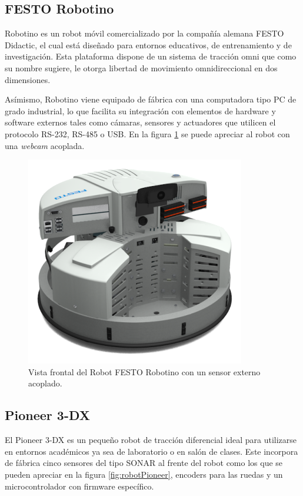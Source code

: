 \subsection{FESTO Robotino}

Robotino es un robot móvil comercializado por la compañía alemana FESTO Didactic, el cual está diseñado para entornos educativos, de entrenamiento y de investigación.
Esta plataforma dispone de un sistema de tracción omni que como su nombre sugiere, le otorga libertad de movimiento omnidireccional en dos dimensiones.

Asímismo, Robotino viene equipado de fábrica con una computadora tipo PC de grado industrial, lo que facilita su integración con elementos de hardware y software externos tales como cámaras, sensores y actuadores que utilicen el protocolo RS-232, RS-485 o USB. En la figura \ref{fig:robotRobotino} se puede apreciar al robot con una \textit{webcam} acoplada.

\begin{figure}[ht]
	\centering
	\includegraphics[scale=1.4]{./Figures/robotino.png}
	\caption{Vista frontal del Robot FESTO Robotino con un sensor externo acoplado.\protect\footnotemark}
	\label{fig:robotRobotino}
\end{figure}



\subsection{Pioneer 3-DX}

El Pioneer 3-DX es un pequeño robot de tracción diferencial ideal para utilizarse en entornos académicos ya sea de laboratorio o en salón de clases. Este incorpora de fábrica cinco sensores del tipo SONAR al frente del robot como los que se pueden apreciar en la figura \ref{fig:robotPioneer}, encoders para las ruedas y un microcontrolador con firmware específico.



